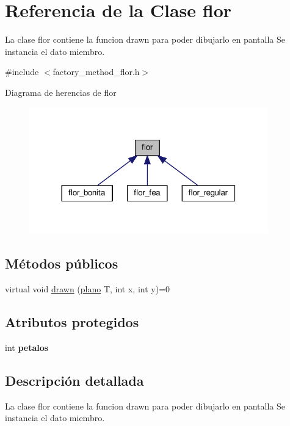 \hypertarget{classflor}{}\section{Referencia de la Clase flor}
\label{classflor}


La clase flor contiene la funcion drawn para poder dibujarlo en pantalla  Se instancia el dato miembro.  




{\ttfamily \#include $<$factory\+\_\+method\+\_\+flor.\+h$>$}



Diagrama de herencias de flor
\nopagebreak
\begin{figure}[H]
\begin{center}
\leavevmode
\includegraphics[width=293pt]{classflor__inherit__graph}
\end{center}
\end{figure}
\subsection*{Métodos públicos}
\begin{DoxyCompactItemize}
\item 
virtual void \hyperlink{classflor_a5fd1bd8f51024b772a5da6c0f6c8e9e2}{drawn} (\hyperlink{classplano}{plano} T, int x, int y)=0
\end{DoxyCompactItemize}
\subsection*{Atributos protegidos}
\begin{DoxyCompactItemize}
\item 
\mbox{\label{classflor_ae973a3f5eedbeed6fa48e71743b9d6f3}} 
int {\bfseries petalos}
\end{DoxyCompactItemize}


\subsection{Descripción detallada}
La clase flor contiene la funcion drawn para poder dibujarlo en pantalla  Se instancia el dato miembro. 

